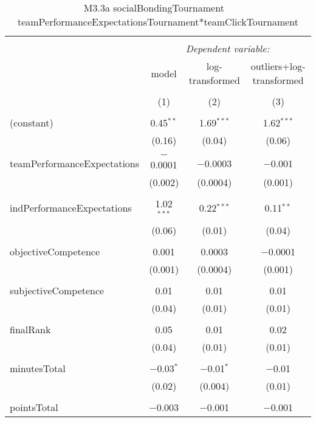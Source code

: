 
\begin{table}[!htbp] \centering 
  \caption{M3.3a socialBondingTournament ~ teamPerformanceExpectationsTournament*teamClickTournament} 
  \label{tab:MLM33ateamPerfBondingTournamentInteractionComparison} 
\scriptsize 
\begin{tabular}{@{\extracolsep{5pt}}lccc} 
\\[-1.8ex]\hline 
\hline \\[-1.8ex] 
 & \multicolumn{3}{c}{\textit{Dependent variable:}} \\ 
\cline{2-4} 
 & model & log-transformed & outliers+log-transformed \\ 
\\[-1.8ex] & (1) & (2) & (3)\\ 
\hline \\[-1.8ex] 
 (constant) & 0.45$^{**}$ & 1.69$^{***}$ & 1.62$^{***}$ \\ 
  & (0.16) & (0.04) & (0.06) \\ 
  & & & \\ 
 teamPerformanceExpectations & $-$0.0001 & $-$0.0003 & $-$0.001 \\ 
  & (0.002) & (0.0004) & (0.001) \\ 
  & & & \\ 
 indPerformanceExpectations & 1.02$^{***}$ & 0.22$^{***}$ & 0.11$^{**}$ \\ 
  & (0.06) & (0.01) & (0.04) \\ 
  & & & \\ 
 objectiveCompetence & 0.001 & 0.0003 & $-$0.0001 \\ 
  & (0.001) & (0.0004) & (0.001) \\ 
  & & & \\ 
 subjectiveCompetence & 0.01 & 0.01 & 0.01 \\ 
  & (0.04) & (0.01) & (0.01) \\ 
  & & & \\ 
 finalRank & 0.05 & 0.01 & 0.02 \\ 
  & (0.04) & (0.01) & (0.01) \\ 
  & & & \\ 
 minutesTotal & $-$0.03$^{*}$ & $-$0.01$^{*}$ & $-$0.01 \\ 
  & (0.02) & (0.004) & (0.01) \\ 
  & & & \\ 
 pointsTotal & $-$0.003 & $-$0.001 & $-$0.001 \\ 

\end{tabular}
\end{table}
